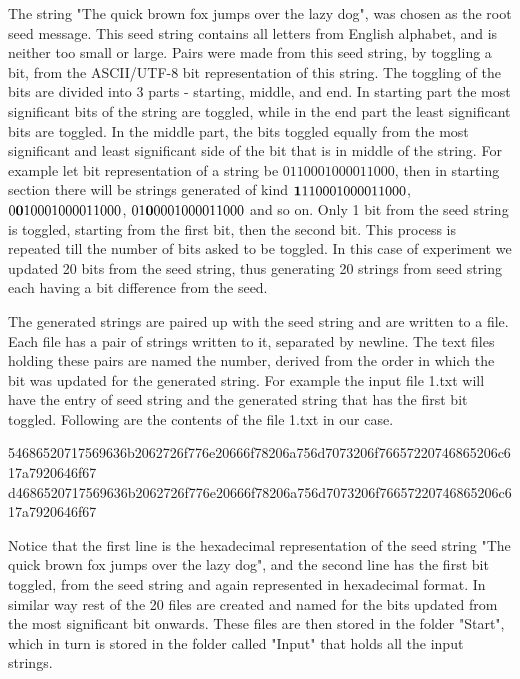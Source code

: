 The string "The quick brown fox jumps over the lazy dog", was chosen as the root seed message. This seed string
contains all letters from English alphabet, and is neither too small or large. Pairs were made from this seed
string, by toggling a bit, from the ASCII/UTF-8 bit representation of this string. The toggling of the bits are
divided into 3 parts - starting, middle, and end. In starting part the most significant bits of the string are
toggled, while in the end part the least significant bits are toggled. In the middle part, the bits toggled 
equally from the most significant and least significant side of the bit that is in middle of the string. For
example let bit representation of a string be $01100010 00011000$, then in starting section there will be strings
generated of kind ${\bf 1}1100010 00011000$, $0{\bf 0}100010 00011000$, $01{\bf 0}00010 00011000$ and so on. 
Only 1 bit from the seed string is toggled, starting from the first bit, then the second bit. This process is
repeated till the number of bits asked to be toggled. In this case of experiment we updated 20 bits from the
seed string, thus generating 20 strings from seed string each having a bit difference from the seed.

The generated strings are paired up with the seed string and are written to a file. Each file has a pair of
strings written to it, separated by newline. The text files holding these pairs are named the number, derived
from the order in which the bit was updated for the generated string. For example the input file 1.txt will
have the entry of seed string and the generated string that has the first bit toggled. Following are the
contents of the file 1.txt in our case.

\begin{center}54686520717569636b2062726f776e20666f78206a756d7073206f76657220746865206c617a7920646f67
d4686520717569636b2062726f776e20666f78206a756d7073206f76657220746865206c617a7920646f67\end{center}

Notice that the first line is the hexadecimal representation of the seed string "The quick brown fox jumps over
the lazy dog", and the second line has the first bit toggled, from the seed string and again represented in
hexadecimal format. In similar way rest of the 20 files are created and named for the bits updated from the most 
significant bit onwards. These files are then stored in the folder "Start", which in turn is stored in the folder 
called "Input" that holds all the input strings.

